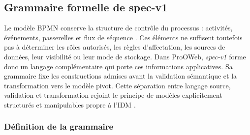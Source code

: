 
\subsection{Grammaire formelle de spec-v1}
\label{sec:chap3-grammaire-specv1}

Le modèle BPMN conserve la structure de contrôle du processus : activités,
événements, passerelles et flux de séquence \cite{omg2013bpmn}. Ces éléments ne
suffisent toutefois pas à déterminer les rôles autorisés, les règles
d'affectation, les sources de données, leur visibilité ou leur mode de stockage.
Dans ProOWeb, \textit{spec-v1} forme donc un langage complémentaire qui porte ces
informations applicatives. Sa grammaire fixe les constructions admises avant la
validation sémantique et la transformation vers le modèle pivot. Cette séparation
entre langage source, validation et transformation rejoint le principe de
modèles explicitement structurés et manipulables propre à l'IDM
\cite{jezequel2012}.

\subsubsection*{Définition de la grammaire}

